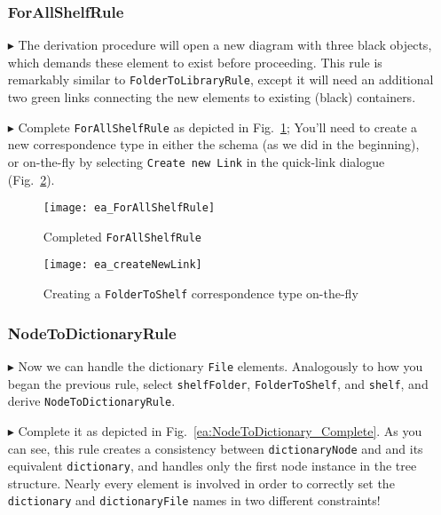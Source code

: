 \begin{itemize}
\newpage

\subsubsection{ForAllShelfRule} %

\item[$\blacktriangleright$] The derivation procedure will open a new diagram with three black objects, which demands these element to exist
before proceeding. This rule is remarkably similar to \texttt{FolderToLibraryRule}, except it will need an additional two green links connecting the new
elements to existing (black) containers.

\item[$\blacktriangleright$] Complete \texttt{ForAllShelfRule} as depicted in Fig.~\ref{ea:ForAllShelves_Complete}; You'll need to create a new correspondence
type in either the schema (as we did in the beginning), or on-the-fly by selecting \texttt{Create new Link} in the quick-link dialogue
(Fig.~\ref{ea:corrOnTheFly}).

\begin{figure}[htbp]
\begin{center}
  \texttt{[image: ea\_ForAllShelfRule]}
  \caption{Completed \texttt{ForAllShelfRule}}
  \label{ea:ForAllShelves_Complete}
\end{center}
\end{figure}

\begin{figure}[htbp]
\begin{center}
  \texttt{[image: ea\_createNewLink]}
  \caption{Creating a \texttt{FolderToShelf} correspondence type on-the-fly}
  \label{ea:corrOnTheFly}
\end{center}
\end{figure}

\subsubsection{NodeToDictionaryRule} %

\item[$\blacktriangleright$] Now we can handle the dictionary \texttt{File} elements. Analogously to how you began the previous rule, select
\texttt{shelfFolder}, \texttt{FolderToShelf}, and \texttt{shelf}, and derive \texttt{NodeToDictionaryRule}.

\item[$\blacktriangleright$] Complete it as depicted in Fig.~\ref{ea:NodeToDictionary_Complete}. As you can see, this rule creates a consistency between
\texttt{dictionaryNode} and and its equivalent \texttt{dictionary}, and handles only the first node instance in the tree structure. Nearly every
element is involved in order to correctly set the \texttt{dictionary} and \texttt{dictionaryFile} names in two different constraints!


\end{itemize}
